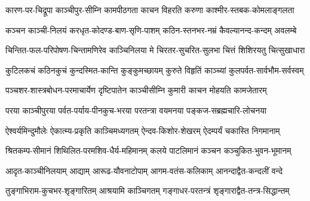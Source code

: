 


\twolineshloka
{कारण-पर-चिद्रूपा काञ्चीपुर-सीम्नि कामपीठगता}
{काचन विहरति करुणा काश्मीर-स्तबक-कोमलाङ्गलता}%

\twolineshloka
{कञ्चन काञ्ची-निलयं करधृत-कोदण्ड-बाण-सृणि-पाशम्}
{कठिन-स्तनभर-नम्रं कैवल्यानन्द-कन्दम् अवलम्बे}%

\twolineshloka
{चिन्तित-फल-परिपोषण-चिन्तामणिरेव काञ्चिनिलया मे}
{चिरतर-सुचरित-सुलभा चित्तं शिशिरयतु चित्सुखाधारा}%

\twolineshloka
{कुटिलकचं कठिनकुचं कुन्दस्मित-कान्ति कुङ्कुमच्छायम्}
{कुरुते विहृतिं काञ्च्यां कुलपर्वत-सार्वभौम-सर्वस्वम्}%

\twolineshloka
{पञ्चशर-शास्त्रबोधन-परमाचार्येण दृष्टिपातेन}
{काञ्चीसीम्नि कुमारी काचन मोहयति कामजेतारम्}%

\twolineshloka
{परया काञ्चीपुरया पर्वत-पर्याय-पीनकुच-भरया}
{परतन्त्रा वयमनया पङ्कज-सब्रह्मचारि-लोचनया}%

\twolineshloka
{ऐश्वर्यमिन्दुमौलेः ऐकात्म्य-प्रकृति काञ्चिमध्यगतम्}
{ऐन्दव-किशोर-शेखरम् ऐदम्पर्यं चकास्ति निगमानाम्}%

\twolineshloka
{श्रितकम्प-सीमानं शिथिलित-परमशिव-धैर्य-महिमानम्}
{कलये पाटलिमानं कञ्चन कञ्चुकित-भुवन-भूमानम्}%

\twolineshloka
{आदृत-काञ्चीनिलयाम् आद्याम् आरूढ-यौवनाटोपाम्}
{आगम-वतंस-कलिकाम् आनन्दाद्वैत-कन्दलीं वन्दे}%

\twolineshloka
{तुङ्गाभिराम-कुचभर-शृङ्गारितम् आश्रयामि काञ्चिगतम्}
{गङ्गाधर-परतन्त्रं शृङ्गाराद्वैत-तन्त्र-सिद्धान्तम्}%

